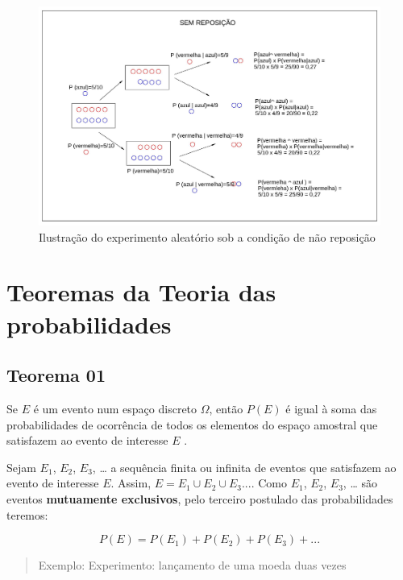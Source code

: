 \documentclass[
]{book}
\begin{document}
\begin{figure}

{\centering \includegraphics[width=0.5\linewidth]{images4/sem_rep} 

}

\caption{Ilustração do experimento aleatório sob a condição de não reposição}\label{fig:unnamed-chunk-74}
\end{figure}

\hypertarget{teoremas-da-teoria-das-probabilidades}{%
\section{Teoremas da Teoria das probabilidades}\label{teoremas-da-teoria-das-probabilidades}}

\hypertarget{teorema-01}{%
\subsection{Teorema 01}\label{teorema-01}}

\hfill\break

Se \(E\) é um evento num espaço discreto \(\Omega\), então \(P(E)\) é igual à soma das probabilidades de ocorrência de todos os elementos do espaço amostral que satisfazem ao evento de interesse \(E\) .

\hfill\break

Sejam \(E_{1}\), \(E_{2}\), \(E_{3}\), \ldots{} a sequência finita ou infinita de eventos que satisfazem ao evento de interesse \(E\). Assim, \(E = E_{1} \cup E_{2} \cup E_{3}...\). Como \(E_{1}\), \(E_{2}\), \(E_{3}\), \ldots{} são eventos \textbf{mutuamente exclusivos}, pelo terceiro postulado das probabilidades teremos:

\hfill\break

\[
P(E) = P(E_{1}) + P(E_{2}) + P(E_{3}) + ...
\]

\hfill\break

\begin{quote}
Exemplo: Experimento: lançamento de uma moeda duas vezes
\end{quote}
\end{document}
